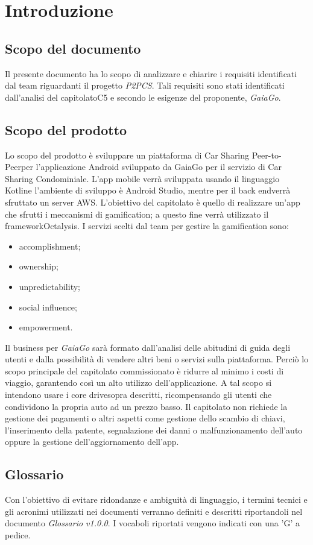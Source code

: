 \section{Introduzione} 
\subsection{Scopo del documento}
Il presente documento ha lo scopo di analizzare e chiarire i requisiti identificati dal team riguardanti il progetto \textit{P2PCS}. Tali requisiti sono stati identificati dall'analisi del capitolato\glosp C5 e secondo le esigenze del proponente, \textit{GaiaGo}.
\subsection{Scopo del prodotto}
Lo scopo del prodotto è sviluppare un piattaforma di Car Sharing Peer-to-Peer\glosp  per l'applicazione Android sviluppato da GaiaGo per il servizio di Car Sharing Condominiale. L'app mobile verrà sviluppata usando il linguaggio Kotlin\glosp e l'ambiente di sviluppo è Android Studio, mentre per il back end\glosp verrà sfruttato un server AWS\glo. L'obiettivo del capitolato è quello di realizzare un'app che sfrutti i meccanismi di gamification\glo; a questo fine verrà utilizzato il framework\glosp Octalysis\glo. I servizi scelti dal team per gestire la gamification sono:
\begin{itemize}
	\item {accomplishment};
	\item {ownership};
	\item {unpredictability};
	\item {social influence};
	\item {empowerment}.
\end{itemize}
Il business per \textit{GaiaGo} sarà formato dall'analisi delle abitudini di guida degli utenti e dalla possibilità di vendere altri beni o servizi sulla piattaforma. Perciò lo scopo principale del capitolato commissionato è ridurre al minimo i costi di viaggio, garantendo così un alto utilizzo dell'applicazione. 
A tal scopo si intendono usare i core drive\glosp sopra descritti, ricompensando gli utenti che condividono la propria auto ad un prezzo basso. Il capitolato non richiede la gestione dei pagamenti o altri aspetti come gestione dello scambio di chiavi, l'inserimento della patente, segnalazione dei danni o malfunzionamento dell'auto oppure la gestione dell'aggiornamento dell'app.

\subsection{Glossario}
Con l’obiettivo di evitare ridondanze e ambiguità di linguaggio, i termini tecnici e gli acronimi utilizzati nei documenti verranno definiti e descritti riportandoli nel documento \textit{Glossario v1.0.0}.  I vocaboli riportati vengono indicati con una 'G' a pedice.
